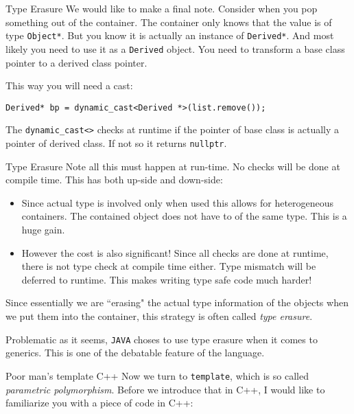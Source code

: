 \begin{frame}[fragile]{Type Erasure}
We would like to make a final note. Consider when you pop something out of the container. The container only knows that the value is of type \texttt{Object*}. But you know it is actually an instance of \texttt{Derived*}. And most likely you need to use it as a \texttt{Derived} object. You need to transform a base class pointer to a derived class pointer.

\vspace{0.1in}

This way you will need a cast:
\begin{verbatim}
Derived* bp = dynamic_cast<Derived *>(list.remove());
\end{verbatim} 
The \texttt{dynamic\_cast<>} checks at \alert{runtime} if the pointer of base class is actually a pointer of derived class. If not so it returns \texttt{nullptr}. 
\end{frame}

\begin{frame}{Type Erasure}
Note all this must happen at run-time. No checks will be done at compile time. This has both up-side and down-side:
\begin{itemize}
	\item Since actual type is involved only when used this allows for heterogeneous containers. The contained object does not have to of the same type. This is a huge gain.
	\item However the cost is also significant! Since all checks are done at runtime, there is not type check at compile time either. Type mismatch will be deferred to runtime. This makes writing type safe code much harder!
\end{itemize}
Since essentially we are ``erasing" the actual type information of the objects when we put them into the container, this strategy is often called \textit{type erasure}. 

Problematic as it seems, \texttt{JAVA} choses to use type erasure when it comes to generics. This is one of the debatable feature of the language. 
\end{frame}

\begin{frame}{Poor man's template C++}
Now we turn to \texttt{template}, which is so called \textit{parametric polymorphism}. Before we introduce that in C++, I would like to familiarize you with a piece of code in C++:
\inputminted[]{c++}{code/rc11cp/poly.cpp}
\end{frame}

